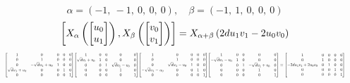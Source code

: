 \documentclass[11pt]{article}
\theoremstyle{definition}
\begin{document}
\[
\alpha = \left( -1, \  -1, \  0, \  0, \  0\right), \quad \beta = \left( -1, \  1, \  0, \  0, \  0\right)
\]
\[
\scaletoalign{\textwidth}{\left[ X_{\alpha}\left(\left[\begin{matrix}u_{0}\\u_{1}\end{matrix}\right]\right), X_{\beta}\left(\left[\begin{matrix}v_{0}\\v_{1}\end{matrix}\right]\right) \right] = X_{\alpha + \beta}\left(2 d u_{1} v_{1} - 2 u_{0} v_{0}\right)}
\]
\[
\scaletoalign{\textwidth}{{\left[\begin{matrix}1 & 0 & 0 & 0 & 0\\0 & 1 & 0 & 0 & 0\\0 & - \sqrt{d} u_{1} + u_{0} & 1 & 0 & 0\\\sqrt{d} u_{1} + u_{0} & 0 & 0 & 1 & 0\\0 & 0 & 0 & 0 & 1\end{matrix}\right]} {\left[\begin{matrix}1 & 0 & 0 & 0 & 0\\\sqrt{d} v_{1} + v_{0} & 1 & 0 & 0 & 0\\0 & 0 & 1 & \sqrt{d} v_{1} - v_{0} & 0\\0 & 0 & 0 & 1 & 0\\0 & 0 & 0 & 0 & 1\end{matrix}\right]} {\left[\begin{matrix}1 & 0 & 0 & 0 & 0\\0 & 1 & 0 & 0 & 0\\0 & \sqrt{d} u_{1} - u_{0} & 1 & 0 & 0\\- \sqrt{d} u_{1} - u_{0} & 0 & 0 & 1 & 0\\0 & 0 & 0 & 0 & 1\end{matrix}\right]} {\left[\begin{matrix}1 & 0 & 0 & 0 & 0\\- \sqrt{d} v_{1} - v_{0} & 1 & 0 & 0 & 0\\0 & 0 & 1 & - \sqrt{d} v_{1} + v_{0} & 0\\0 & 0 & 0 & 1 & 0\\0 & 0 & 0 & 0 & 1\end{matrix}\right]} = {\left[\begin{matrix}1 & 0 & 0 & 0 & 0\\0 & 1 & 0 & 0 & 0\\- 2 d u_{1} v_{1} + 2 u_{0} v_{0} & 0 & 1 & 0 & 0\\0 & 0 & 0 & 1 & 0\\0 & 0 & 0 & 0 & 1\end{matrix}\right]}}
\]
\end{document}
